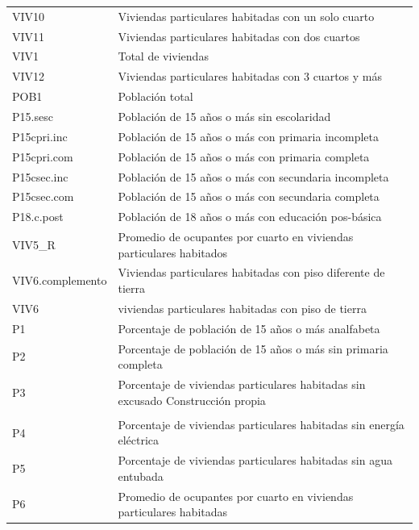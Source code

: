 \documentclass[paper=letter, fontsize=11pt]{scrartcl}
\numberwithin{equation}{section} %
\numberwithin{figure}{section} %
\numberwithin{table}{section} %
\begin{document}
\begin{enumerate}
\begin{enumerate}
\begin{table}[H]
\begin{tabular}{ll}
VIV10        	&	      Viviendas particulares habitadas con un solo cuarto    	\\
VIV11    	&	     Viviendas particulares habitadas con dos cuartos    	\\
VIV1          	&	       Total de viviendas    	\\
VIV12           	&	      Viviendas particulares habitadas con 3 cuartos y más           	\\
POB1          	&	       Población total    	\\
P15.sesc           	&	       Población de 15 años o más sin escolaridad    	\\
P15cpri.inc    	&	       Población de 15 años o más con primaria incompleta           	\\
P15cpri.com    	&	       Población de 15 años o más con primaria completa             	\\
P15csec.inc    	&	       Población de 15 años o más con secundaria incompleta           	\\
P15csec.com    	&	       Población de 15 años o más con secundaria completa             	\\
P18.c.post             	&	     Población de 18 años o más con educación pos-básica    	\\
VIV5\_R 	&	 Promedio de ocupantes por cuarto en viviendas particulares habitados            	\\
VIV6.complemento          	&	       Viviendas particulares habitadas con piso diferente de tierra    	\\
VIV6    	&	      viviendas particulares habitadas con piso de tierra    	\\
P1       	&	     Porcentaje de población de 15 años o más analfabeta    	\\
P2             	&	     Porcentaje de población de 15 años o más sin primaria completa             	\\
P3             	&	     Porcentaje de viviendas particulares habitadas sin excusado           Construcción propia\\	\\
P4             	&	     Porcentaje de viviendas particulares habitadas sin energía eléctrica            	\\
P5             	&	     Porcentaje de viviendas particulares habitadas sin agua entubada             	\\
P6             	&	     Promedio de ocupantes por cuarto en viviendas particulares habitadas            	\\

\end{tabular}
\end{table}
\end{enumerate}
\end{enumerate}
\end{document}
